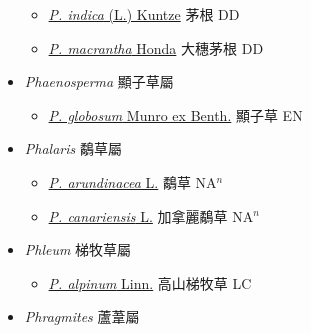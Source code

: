 \begin{itemize}
  \begin{itemize}
        \item[] \href{http://www.theplantlist.org/tpl1.1/search?q=Perotis+indica}{\textit{P. indica} (L.) Kuntze}   茅根 DD
        \item[] \href{http://www.theplantlist.org/tpl1.1/search?q=Perotis+macrantha}{\textit{P. macrantha} Honda}   大穗茅根 DD
  \end{itemize}
 \item[] \textit{Phaenosperma} 顯子草屬
                    
  \begin{itemize}
        \item[] \href{http://www.theplantlist.org/tpl1.1/search?q=Phaenosperma+globosum}{\textit{P. globosum} Munro ex Benth.}     顯子草 EN
  \end{itemize}
 \item[] \textit{Phalaris} 鷸草屬
                    
  \begin{itemize}
        \item[] \href{http://www.theplantlist.org/tpl1.1/search?q=Phalaris+arundinacea}{\textit{P. arundinacea} L.}   鷸草 NA$^n$
        \item[] \href{http://www.theplantlist.org/tpl1.1/search?q=Phalaris+canariensis}{\textit{P. canariensis} L.}   加拿麗鷸草 NA$^n$
  \end{itemize}
 \item[] \textit{Phleum} 梯牧草屬
                    
  \begin{itemize}
        \item[] \href{http://www.theplantlist.org/tpl1.1/search?q=Phleum+alpinum}{\textit{P. alpinum} Linn.}   高山梯牧草 LC
  \end{itemize}
 \item[] \textit{Phragmites} 蘆葦屬
                    

\end{itemize}

